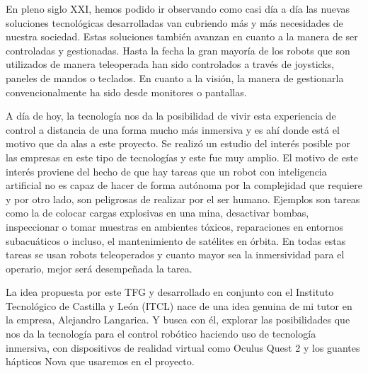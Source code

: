 En pleno siglo XXI, hemos podido ir observando como casi día a día las nuevas soluciones tecnológicas desarrolladas van cubriendo más y más necesidades de nuestra sociedad. Estas soluciones también avanzan en cuanto a la manera de ser controladas y gestionadas. Hasta la fecha la gran mayoría de los robots que son utilizados de manera teleoperada han sido controlados a través de joysticks, paneles de mandos o teclados. En cuanto a la visión, la manera de gestionarla convencionalmente ha sido desde monitores o pantallas. 

A día de hoy, la tecnología nos da la posibilidad de vivir esta experiencia de control a distancia de una forma mucho más inmersiva y es ahí donde está el motivo que da alas a este proyecto. Se realizó un estudio del interés posible por las empresas en este tipo de tecnologías y este fue muy amplio. El motivo de este interés proviene del hecho de que hay tareas que un robot con inteligencia artificial no es capaz de hacer de forma autónoma por la complejidad que requiere y por otro lado, son peligrosas de realizar por el ser humano. Ejemplos son tareas como la de colocar cargas explosivas en una mina, desactivar bombas, inspeccionar o tomar muestras en ambientes tóxicos, reparaciones en entornos subacuáticos o incluso, el mantenimiento de satélites en órbita. En todas estas tareas se usan robots teleoperados y cuanto mayor sea la inmersividad para el operario, mejor será desempeñada la tarea.

La idea propuesta por este TFG y desarrollado en conjunto con el Instituto Tecnológico de Castilla y León (ITCL) \cite{ITCL} nace de una idea genuina de mi tutor en la empresa, Alejandro Langarica. Y busca con él, explorar las posibilidades que nos da la tecnología para el control robótico haciendo uso de tecnología inmersiva, con dispositivos de realidad virtual\cite{VR} como Oculus Quest 2 \cite{Quest2} y los guantes hápticos Nova que usaremos en el proyecto.


